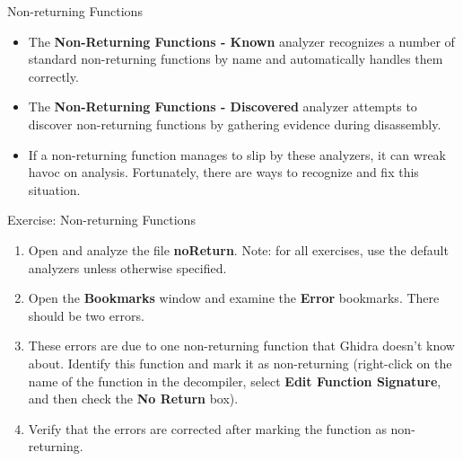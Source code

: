 \documentclass{beamer}
\begin{document}
\begin{frame}
\begin{block}{Non-returning Functions}
\begin{itemize}
\item The \textbf{Non-Returning Functions - Known} analyzer recognizes a number of standard non-returning functions by name and automatically handles them correctly.
\item The \textbf{Non-Returning Functions - Discovered} analyzer attempts to discover non-returning functions by gathering evidence during disassembly.
\item If a non-returning function manages to slip by these analyzers, it can wreak havoc on analysis.  Fortunately, there are ways to recognize and fix this situation.
\end{itemize}
\end{block}
\end{frame}

\begin{frame}
\begin{block}{Exercise: Non-returning Functions}
\begin{enumerate}
\item Open and analyze the file \textbf{noReturn}. Note: for all exercises, use the default analyzers unless otherwise specified.
\item Open the \textbf{Bookmarks} window and examine the \textbf{Error} bookmarks. There should be two errors.
\item These errors are due to one non-returning function that Ghidra doesn't know about.  Identify this function and mark it as non-returning (right-click on the name of the function in
the decompiler, select \textbf{Edit Function Signature}, and then check the \textbf{No Return} box).
\item Verify that the errors are corrected after marking the function as non-returning.
\end{enumerate}
\end{block}
\end{frame}
\end{document}
